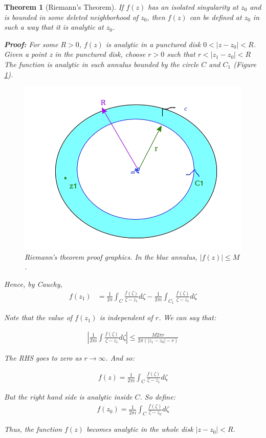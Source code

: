 \documentclass{article}
\newtheorem{theorem}{Theorem}[section]
\theoremstyle{definition}
\begin{document}
\begin{theorem}[Riemann's Theorem]
	If $f(z)$ has an isolated singularity at $z_0$ and is bounded in some deleted neighborhood of $z_0$, then $f(z)$ can be defined at $z_0$ in such a way that it is analytic at $z_0$. 
	
	\textbf{Proof:} For some $R>0$, $f(z)$ is analytic in a punctured disk $0<|z-z_0|<R$. Given a point z in the punctured disk, choose $r>0$ such that $r < |z_1 - z_0|<R$ The function is analytic in such annulus bounded by the circle $C$ and $C_1$ (Figure \ref{fig:riemann}). 
	
	\begin{figure}[H]
		\centering
		\includegraphics[width=0.7\linewidth]{riemann}
		\caption{Riemann's theorem proof graphics. In the blue annulus, $|f(z)|\leq M$.}
		\label{fig:riemann}
	\end{figure}
	Hence, by Cauchy, 
	\begin{align}
	f(z_1) &= \frac{1}{2\pi}\int_C \frac{f(\zeta)}{\zeta - z_1} d\zeta - \frac{1}{2\pi i}\int_{C_1} \frac{f(\zeta)}{\zeta - z_1} d\zeta
	\end{align}
	
	Note that the value of $f(z_1)$ is independent of $r$. We can say that:
	
	\begin{align}
	\left|\frac{1}{2\pi i }\int \frac{f(\zeta)}{\zeta - z_1} d\zeta\right| \leq \frac{M2\pi r}{2\pi (|z_1-z_0|-r)}
	\end{align}
	
	The RHS goes to zero as $r \to \infty$. And so:
	
	\begin{align}
	f(z) = \frac{1}{2\pi i }\int_C \frac{f(\zeta)}{\zeta - z_1} d\zeta
	\end{align}
	
	But the right hand side is analytic inside $C$. So define:
	\begin{align}
	f(z_0) = \frac{1}{2\pi i }\int_C \frac{f(\zeta)}{\zeta - z_0} d\zeta
	\end{align}
	
	Thus, the function $f(z)$ becomes analytic in the whole disk $|z-z_0|<R$. 
	
\end{theorem}
\end{document}
